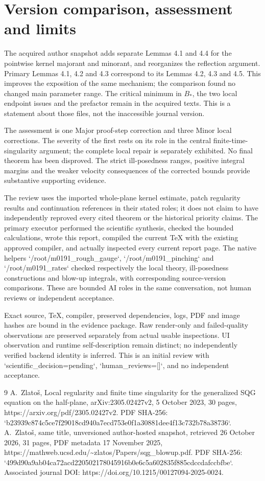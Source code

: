 \documentclass[10pt]{article}
\begin{document}
\section*{Version comparison, assessment and limits}
The acquired author snapshot adds separate Lemmas 4.1 and 4.4 for the pointwise kernel majorant and minorant, and reorganizes the reflection argument. Primary Lemmas 4.1, 4.2 and 4.3 correspond to its Lemmas 4.2, 4.3 and 4.5. This improves the exposition of the same mechanism; the comparison found no changed main parameter range. The critical minimum in \(B_*\), the two local endpoint issues and the prefactor remain in the acquired texts. This is a statement about those files, not the inaccessible journal version.\par
The assessment is one Major proof-step correction and three Minor local corrections. The severity of the first rests on its role in the central finite-time-singularity argument; the complete local repair is separately exhibited. No final theorem has been disproved. The strict ill-posedness ranges, positive integral margins and the weaker velocity consequences of the corrected bounds provide substantive supporting evidence.\par
The review uses the imported whole-plane kernel estimate, patch regularity results and continuation references in their stated roles; it does not claim to have independently reproved every cited theorem or the historical priority claims. The primary executor performed the scientific synthesis, checked the bounded calculations, wrote this report, compiled the current TeX with the existing approved compiler, and actually inspected every current report page. The native helpers `/root/m0191\_rough\_gauge`, `/root/m0191\_pinching` and `/root/m0191\_rates` checked respectively the local theory, ill-posedness constructions and blow-up integrals, with corresponding source-version comparisons. These are bounded AI roles in the same conversation, not human reviews or independent acceptance.\par
Exact source, TeX, compiler, preserved dependencies, logs, PDF and image hashes are bound in the evidence package. Raw render-only and failed-quality observations are preserved separately from actual usable inspections. UI observation and runtime self-description remain distinct; no independently verified backend identity is inferred. This is an initial review with `scientific\_decision=pending`, `human\_reviews=[]`, and no independent acceptance.\par
9 A. Zlatoš, Local regularity and finite time singularity for the generalized SQG equation on the half-plane, arXiv:2305.02427v2, 5 October 2023, 30 pages, https://arxiv.org/pdf/2305.02427v2. PDF SHA-256: `b23939c874c5ce7f29018cd940a7ecd753e0f1a30881dee4f13c732b78a38736`. A. Zlatoš, same title, unversioned author-hosted snapshot, retrieved 26 October 2026, 31 pages, PDF metadata 17 November 2025, https://mathweb.ucsd.edu/\textasciitilde{}zlatos/Papers/sqg\_blowup.pdf. PDF SHA-256: `499d90a9ab04ca72acd220502178045916b0e6c5a602835f885cdccdafccbfbe`. Associated journal DOI: https://doi.org/10.1215/00127094-2025-0024.\par
\end{document}
